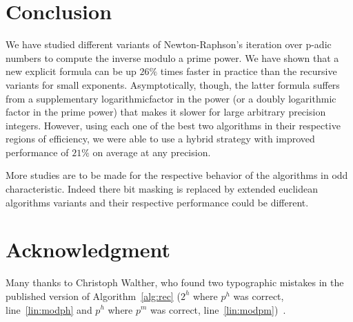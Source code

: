 \section{Conclusion}
We have studied different variants of Newton-Raphson's iteration over
p-adic numbers to compute the inverse modulo a prime power.
We have shown that a new explicit formula can be up $26\%$ times faster in
practice than the recursive variants for small exponents.
Asymptotically, though, the latter formula suffers from a supplementary
logarithmicfactor in the power (or a doubly logarithmic factor in the prime
power) that makes it slower for large arbitrary precision integers. 
However, using each one of the best two algorithms in their respective regions
of efficiency, we were able to use a hybrid strategy with improved performance
of $21\%$ on average at any precision.  

More studies are to be made for the respective behavior of the algorithms in odd
characteristic. Indeed there bit masking is replaced by extended euclidean
algorithms variants and their respective performance could be different.

\section*{Acknowledgment} 
Many thanks to Christoph Walther, who found two typographic mistakes 
in the published version of Algorithm~\ref{alg:rec} ($2^h$ where $p^h$ was
correct, line~\ref{lin:modph} and $p^h$ where $p^m$ was correct,
line~\ref{lin:modpm})~\cite{Walther:2018:cav}.





